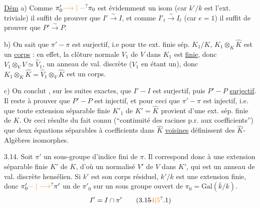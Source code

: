 
\uline{Dém} a) Comme \(\pi'_0\unsure{\longrightarrow|\mathrel{-}}\pi_0\) est évidemment un isom (car \(k'/k\) est l'ext. triviale) il suffit de prouver que \(I'\xrightarrow{\sim}I\), et comme \(I'_t\xrightarrow{\sim}I_t\) (car \(e=1\)) il suffit de prouver que \(P'\xrightarrow{\sim}P\).

b) On sait que \(\pi'\mathrel{-}\pi\) est surjectif, i.e pour tte ext. finie sép. \(K_1/K\), \(K_1\otimes_K\widehat K\) est un \uline{corps} : en effet, la clôture normale \(V_1\) de \(V\) dans \(K_1\) est \uline{finie}, donc \(V_1\otimes_V\widehat V\simeq\widehat V_1\),   un anneau de val. discrète (\(V_1\) en étant un), donc \(K_1\otimes_K\widehat K=\widehat V_1\otimes_V\widehat K\) est un corps.


c) On  conclut , sur les  suites exactes, que \(I'\mathrel{-}I\) est surjectif, puis \(P'\mathrel{-}P\) \uline{surjectif}. Il reste à prouver que \(P'\mathrel{-}P\) est injectif, et pour ceci que \(\pi'\mathrel{-}\pi\) est injectif,  i.e. que toute extension séparable finie \(K'_1\) de \(K'=\widehat K\) provient d'une ext. sép. finie de \(K\). Or ceci résulte du fait connu (``continuité des racines p.r. aux coefficients'') que deux équations séparables  à coefficients dans \(\widehat K\) \uline{voisines} définissent des  \(\widehat K\)-Algèbres isomorphes.


3.14. Soit \(\pi'\) un sous-groupe d'indice fini de \(\pi\). Il correspond donc à une extension séparable finie \(K'\) de \(K\), d'où un normalisé \(V'\) de \(V\) dans \(K'\), qui est un anneau de val. discrète hensélien. Si \(k'\) est son corps résiduel, \(k'/k\) est une extension finie, donc \(\pi'_0\unsure{\mathrel{-}|\longrightarrow}\pi'\)   un  de \(\pi'_0\) sur un sous groupe ouvert de \(\pi_0=\mathrm{Gal}(\bar k/k)\).    
\[
 I'=I\cap\pi' \tag*{(3.1\deleted{5}\unsure{4|5}.1)}
\]

